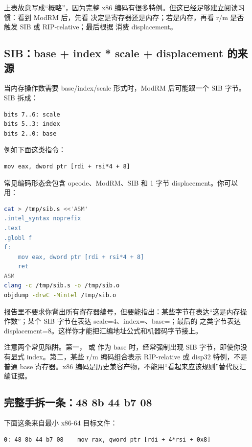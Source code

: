 上表故意写成“概略”，因为完整 x86 编码有很多特例。但这已经足够建立阅读习惯：看到 ModRM 后，先看  决定是寄存器还是内存；若是内存，再看 r/m 是否触发 SIB 或 RIP-relative；最后根据  消费 displacement。

\subsection{SIB：base + index * scale + displacement 的来源}

当内存操作数需要 base/index/scale 形式时，ModRM 后可能跟一个 SIB 字节。SIB 拆成：

\begin{lstlisting}[numbers=none,caption={SIB 字节的位域}]
bits 7..6: scale
bits 5..3: index
bits 2..0: base
\end{lstlisting}

例如下面这类指令：

\begin{lstlisting}
mov eax, dword ptr [rdi + rsi*4 + 8]
\end{lstlisting}

常见编码形态会包含 opcode、ModRM、SIB 和 1 字节 displacement。你可以用：

\begin{lstlisting}[language=bash,caption={生成并拆一条 SIB 寻址指令}]
cat > /tmp/sib.s <<'ASM'
.intel_syntax noprefix
.text
.globl f
f:
    mov eax, dword ptr [rdi + rsi*4 + 8]
    ret
ASM
clang -c /tmp/sib.s -o /tmp/sib.o
objdump -drwC -Mintel /tmp/sib.o
\end{lstlisting}

报告里不要求你背出所有寄存器编号，但要能指出：某些字节在表达“这是内存操作数”；某个 SIB 字节在表达 scale=4、index=、base=；最后的  之类字节表达 displacement=8。这样你才能把汇编地址公式和机器码字节接上。

注意两个常见陷阱。第一， 或  作为 base 时，经常强制出现 SIB 字节，即使你没有显式 index。第二，某些 r/m 编码组合表示 RIP-relative 或 disp32 特例，不是普通 base 寄存器。x86 编码是历史兼容产物，不能用“看起来应该规则”替代反汇编证据。

\subsection{完整手拆一条：48 8b 44 b7 08}

下面这条来自最小 x86-64 目标文件：

\begin{lstlisting}[numbers=none]
0: 48 8b 44 b7 08    mov rax, qword ptr [rdi + 4*rsi + 0x8]
\end{lstlisting}

